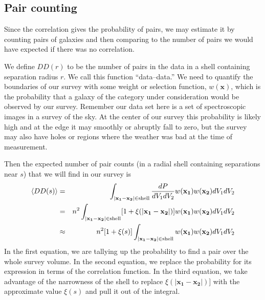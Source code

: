 \subsection{Pair counting}

Since the correlation gives the probability of pairs, we may estimate it by counting pairs of galaxies and then comparing to the number of pairs we would have expected if there was no correlation.

We define $DD(r)$ to be the number of pairs in the data in a shell containing separation radius $r$.  We call this function ``data--data.''  We need to quantify the boundaries of our survey with some weight or selection function, $w(\mathbf{x})$, which is the probability that a galaxy of the category under consideration would be observed by our survey.  Remember our data set here is a set of spectroscopic images in a survey of the sky.  At the center of our survey this probability is likely high and at the edge it may smoothly or abruptly fall to zero, but the survey may also have holes or regions where the weather was bad at the time of measurement. 

Then the expected number of pair counts (in a radial shell containing separations near $s$) that we will find in our survey is
\begin{eqnarray}
  \langle DD(s) \rangle &=& \int_{|\mathbf{x_1 - x_2}| \in \mbox{\scriptsize shell}} \frac{dP}{dV_1 dV_2} w(\mathbf{x_1}) w(\mathbf{x_2}) {dV_1}{dV_2}  \\
  &=& n^2 \int_{|\mathbf{x_1 - x_2}| \in \mbox{\scriptsize shell}} [1 + \xi(|\mathbf{x_1 - x_2}|)] w(\mathbf{x_1}) w(\mathbf{x_2}) {dV_1}{dV_2} \\
  &\approx& n^2 [1 + \xi(s)] \int_{|\mathbf{x_1 - x_2}| \in \mbox{\scriptsize shell}}  w(\mathbf{x_1}) w(\mathbf{x_2}) {dV_1}{dV_2} 
\end{eqnarray}
In the first equation, we are tallying up the probability to find a pair over the whole survey volume.  In the second equation, we replace the probability for its expression in terms of the correlation function.  In the third equation, we take advantage of the narrowness of the shell to replace $\xi(|\mathbf{x_1 - x_2}|)]$ with the approximate value $\xi(s)$ and pull it out of the integral.

